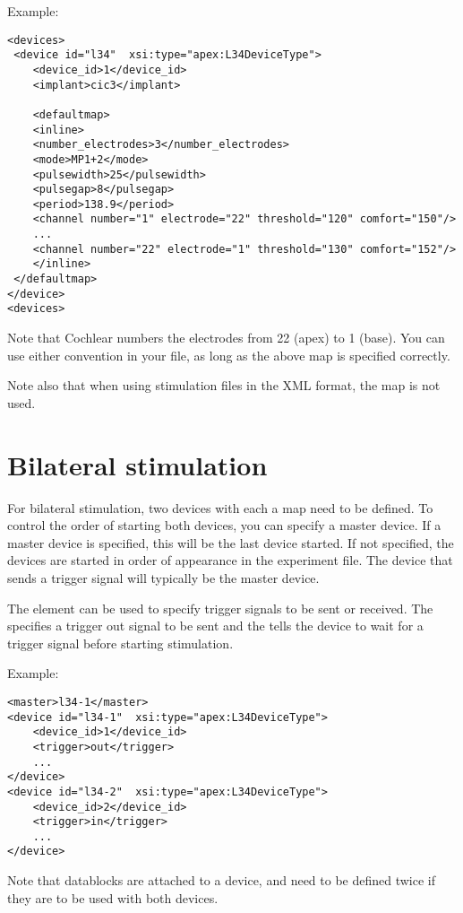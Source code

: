 Example:
\begin{lstlisting}
<devices>
 <device id="l34"  xsi:type="apex:L34DeviceType">
    <device_id>1</device_id>
    <implant>cic3</implant>

    <defaultmap>
    <inline>
    <number_electrodes>3</number_electrodes>
    <mode>MP1+2</mode>
    <pulsewidth>25</pulsewidth>
    <pulsegap>8</pulsegap>
    <period>138.9</period>
    <channel number="1" electrode="22" threshold="120" comfort="150"/>
    ...
    <channel number="22" electrode="1" threshold="130" comfort="152"/>
    </inline>
 </defaultmap>
</device>
<devices>
\end{lstlisting}


Note that Cochlear numbers the electrodes from 22 (apex) to 1 (base). You can use either convention in your  file, as long as the above map is specified correctly.

Note also that when using stimulation files in the XML format, the map is not used.






\section{Bilateral stimulation}
For bilateral stimulation, two devices with each a map need to be defined.
To control the order of starting both devices, you can specify a master device. If a master device is specified, this will be the last device started. If not specified, the devices are started in order of appearance in the experiment file. The device that sends a trigger signal will typically be the master device.

The  element can be used to specify trigger signals to be sent or received. The  specifies a trigger out signal to be sent and the  tells the device to wait for a trigger signal before starting stimulation.

Example:
\begin{lstlisting}
<master>l34-1</master>
<device id="l34-1"  xsi:type="apex:L34DeviceType">
	<device_id>1</device_id>
	<trigger>out</trigger>
	...
</device>
<device id="l34-2"  xsi:type="apex:L34DeviceType">
	<device_id>2</device_id>
	<trigger>in</trigger>
	...
</device>
\end{lstlisting}



Note that datablocks are attached to a device, and need to be defined twice if they are to be used with both devices.


